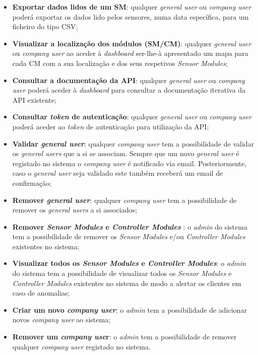 \begin{itemize}
	\item \textbf{Exportar dados lidos de um \acl{SM}}: qualquer \textit{general user} ou \textit{company user} poderá exportar os dados lido pelos sensores, numa data específica, para um ficheiro do tipo \ac{CSV}; 
	
	\item \textbf{Visualizar a localização dos módulos (\acl{SM}/\acl{CM})}: qualquer \textit{general user} ou \textit{company user} ao aceder à \textit{dashboard} ser-lhe-à apresentado um mapa para cada \acl{CM} com a sua localização e dos seus respetivos \textit{Sensor Modules}; 
	
	
	\item \textbf{Consultar a documentação da API}: qualquer \textit{general user} ou \textit{company user} poderá aceder à \textit{dashboard} para consultar a documentação iterativa da \ac{API} existente; 
		
	\item \textbf{Consultar \textit{token} de autenticação}: qualquer \textit{general user} ou \textit{company user} poderá aceder ao \textit{token} de autenticação para utilização da \ac{API}; 
	
	\item \textbf{Validar \textit{general user}}: qualquer \textit{company user} tem a possibilidade de validar os \textit{general users} que a si se associam. Sempre que um novo \textit{general user} é registado no sistema o \textit{company user} é notificado via email. Posteriormente, caso o \textit{general user} seja validado este também receberá um email de confirmação;  
	
	\item \textbf{Remover \textit{general user}}: qualquer \textit{company user} tem a possibilidade de remover os \textit{general users} a si associados; 
	
	
	\item \textbf{Remover \textit{Sensor Modules} e \textit{Controller Modules} }: o \textit{admin} do sistema tem a possibilidade de remover os \textit{Sensor Modules} e/ou \textit{Controller Modules} existentes no sistema; 
	
	
	\item \textbf{Visualizar todos os \textit{Sensor Modules} e \textit{Controller Modules}}: o \textit{admin} do sistema tem a possibilidade de visualizar todos os \textit{Sensor Modules} e \textit{Controller Modules} existentes no sistema de modo a alertar os clientes em caso de anomalias;
	
	
	\item \textbf{Criar um novo \textit{company user}}: o \textit{admin} tem a possibilidade de adicionar novos \textit{company user} ao sistema; 
	
	\item \textbf{Remover um \textit{company use}r}: o \textit{admin} tem a possibilidade de remover qualquer \textit{company user} registado no sistema.
	
	
\end{itemize}

